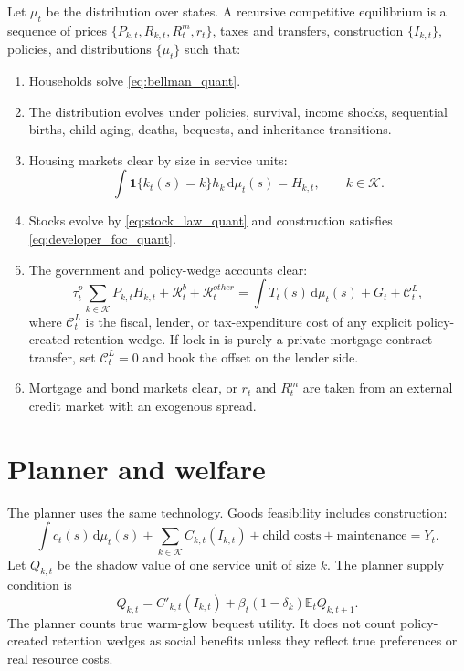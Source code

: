 \documentclass[11pt]{article}
\newcommand{\dd}{\mathrm d}
\newcommand{\E}{\mathbb E}
\newcommand{\1}{\mathbf 1}
\newcommand{\KK}{\mathcal K}
\begin{document}
Let $\mu_t$ be the distribution over states. A recursive competitive equilibrium is a sequence of prices $\{P_{k,t},R_{k,t},R_t^m,r_t\}$, taxes and transfers, construction $\{I_{k,t}\}$, policies, and distributions $\{\mu_t\}$ such that:
\begin{enumerate}
\item Households solve \eqref{eq:bellman_quant}.
\item The distribution evolves under policies, survival, income shocks, sequential births, child aging, deaths, bequests, and inheritance transitions.
\item Housing markets clear by size in service units:
\begin{equation}
\boxed{\int \1\{k_t(s)=k\}h_k\,\dd\mu_t(s)=H_{k,t},\qquad k\in\KK.}
\label{eq:housing_clearing_quant}
\end{equation}
\item Stocks evolve by \eqref{eq:stock_law_quant} and construction satisfies \eqref{eq:developer_foc_quant}.
\item The government and policy-wedge accounts clear:
\begin{equation}
\tau_t^p\sum_{k\in\KK}P_{k,t}H_{k,t}+\mathcal R_t^b+\mathcal R_t^{other}=\int T_t(s)\,\dd\mu_t(s)+G_t+\mathcal C_t^L,
\label{eq:government_budget_quant}
\end{equation}
where $\mathcal C_t^L$ is the fiscal, lender, or tax-expenditure cost of any explicit policy-created retention wedge. If lock-in is purely a private mortgage-contract transfer, set $\mathcal C_t^L=0$ and book the offset on the lender side.
\item Mortgage and bond markets clear, or $r_t$ and $R_t^m$ are taken from an external credit market with an exogenous spread.
\end{enumerate}

\section{Planner and welfare}

The planner uses the same technology. Goods feasibility includes construction:
\begin{equation}
\int c_t(s)\,\dd\mu_t(s)+\sum_{k\in\KK}C_{k,t}(I_{k,t})+\text{child costs}+\text{maintenance}=Y_t.
\end{equation}
Let $Q_{k,t}$ be the shadow value of one service unit of size $k$. The planner supply condition is
\begin{equation}
Q_{k,t}=C'_{k,t}(I_{k,t})+\beta_t(1-\delta_k)\E_tQ_{k,t+1}.
\label{eq:planner_supply_quant}
\end{equation}
The planner counts true warm-glow bequest utility. It does not count policy-created retention wedges as social benefits unless they reflect true preferences or real resource costs.
\end{document}
